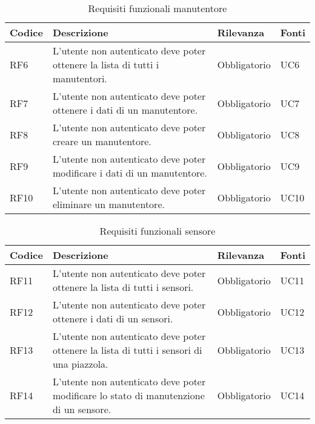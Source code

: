 \begin{table}[H]
    \begin{tabular}{|p{1cm}|p{6cm}|p{1.9cm}|p{1.8cm}|} 
    \hline
    Codice & Descrizione & Rilevanza &  Fonti \\ 
    \hline
    RF6 & L'utente non autenticato deve poter ottenere la lista di tutti i manutentori. & Obbligatorio & UC6 \\ 
    \hline
    RF7 & L'utente non autenticato deve poter ottenere i dati di un manutentore. & Obbligatorio & UC7 \\ 
    \hline
    RF8 & L'utente non autenticato deve poter creare un manutentore. & Obbligatorio & UC8 \\ 
    \hline
    RF9 & L'utente non autenticato deve poter modificare i dati di un manutentore. & Obbligatorio & UC9 \\
    \hline
    RF10 & L'utente non autenticato deve poter eliminare un manutentore. & Obbligatorio & UC10 \\ 
    \hline
    \end{tabular}
    \caption{Requisiti funzionali manutentore}
\end{table}
\begin{table}[H]
    \begin{tabular}{|p{1cm}|p{6cm}|p{1.9cm}|p{1.8cm}|} 
    \hline
    Codice & Descrizione & Rilevanza &  Fonti \\ 
    \hline
    RF11 & L'utente non autenticato deve poter ottenere la lista di tutti i sensori. & Obbligatorio & UC11 \\ 
    \hline
    RF12 & L'utente non autenticato deve poter ottenere i dati di un sensori. & Obbligatorio & UC12 \\ 
    \hline
    RF13 & L'utente non autenticato deve poter ottenere la lista di tutti i sensori di una piazzola. & Obbligatorio & UC13 \\ 
    \hline
    RF14 & L'utente non autenticato deve poter modificare lo stato di manutenzione di un sensore. & Obbligatorio & UC14 \\ 
    \hline
    \end{tabular}
    \caption{Requisiti funzionali sensore}
\end{table}

